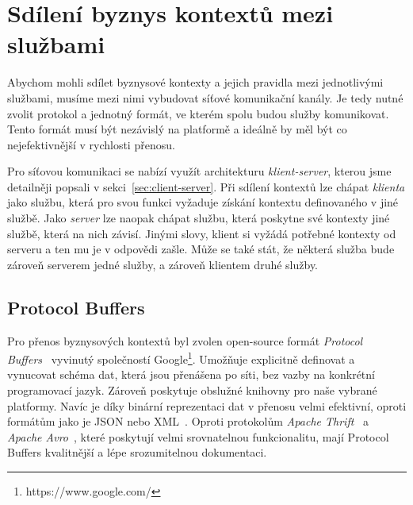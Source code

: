 \section{Sdílení byznys kontextů mezi službami}

Abychom mohli sdílet byznysové kontexty a jejich pravidla
mezi jednotlivými službami, musíme mezi nimi vybudovat
síťové komunikační kanály. Je tedy nutné zvolit protokol
a jednotný formát, ve kterém spolu budou služby komunikovat.
Tento formát musí být nezávislý na platformě a ideálně
by měl být co nejefektivnější v rychlosti přenosu.

Pro síťovou komunikaci se nabízí využít architekturu
\textit{klient-server}, kterou jsme detailněji popsali
v sekci~\ref{sec:client-server}. Při sdílení kontextů
lze chápat \textit{klienta} jako službu, která pro svou funkci
vyžaduje získání kontextu definovaného v jiné službě.
Jako \textit{server} lze naopak chápat službu, která poskytne
své kontexty jiné službě, která na nich závisí. Jinými slovy,
klient si vyžádá potřebné kontexty od serveru a ten mu je v
odpovědi zašle. Může se také stát, že některá služba bude zároveň
serverem jedné služby, a zároveň klientem druhé služby.

\subsection{Protocol Buffers}

Pro přenos byznysových kontextů byl zvolen open-source formát
\textit{Protocol Buffers}~\cite{protobuf}\cite{varda2008protocol}
vyvinutý společností Google\footnote{https://www.google.com/}.
Umožňuje explicitně definovat a vynucovat schéma dat,
která jsou přenášena po síti, bez vazby na konkrétní programovací
jazyk. Zároveň poskytuje obslužné knihovny pro naše vybrané platformy.
Navíc je díky binární reprezentaci dat v přenosu velmi efektivní,
oproti formátům jako je \gls{JSON} nebo \gls{XML}~\cite{maeda2012performance}.
Oproti protokolům \textit{Apache Thrift}~\cite{thrift}
a \textit{Apache Avro}~\cite{avro}, které poskytují
velmi srovnatelnou funkcionalitu, mají Protocol Buffers
kvalitnější a lépe srozumitelnou dokumentaci.



